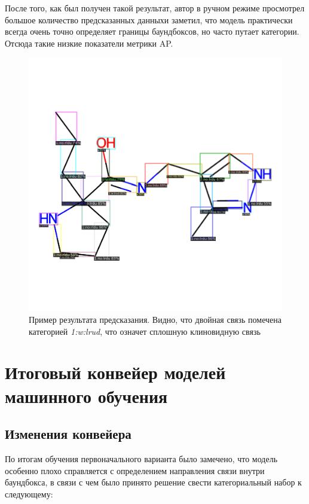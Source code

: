 После того, как был получен такой результат, автор в ручном режиме просмотрел большое количество предсказанных данныхи заметил, что модель практически всегда очень точно определяет границы баундбоксов, но часто путает категории. Отсюда такие низкие показатели метрики AP.

\begin{figure}[h!] 
	\center
	\includegraphics [scale=0.25] {my_folder/images/incorrect_faster_rcnn}
	\caption{Пример результата предсказания. Видно, что двойная связь помечена категорией \textit{1:w:lrud}, что означет сплошную клиновидную связь} 
	\label{fig:rcnn_false}
\end{figure}


\section{Итоговый конвейер моделей машинного обучения} \label{ch2:sec3}
\subsection{Изменения конвейера}
По итогам обучения первоначального варианта было замечено, что модель особенно плохо справляется с определением направления связи внутри баундбокса, в связи с чем было принято решение свести категориальный набор к следующему:

